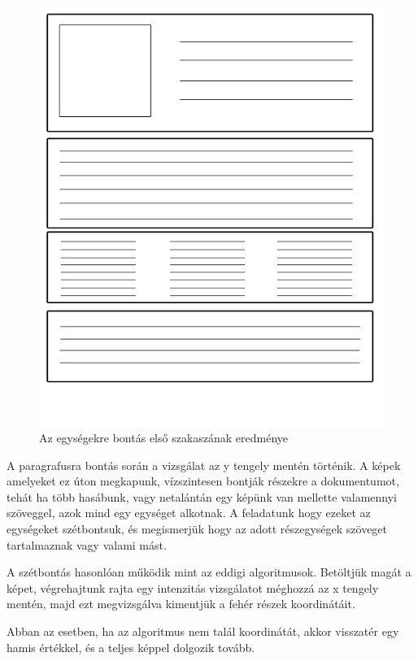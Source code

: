 \begin{figure}[H]
\centering
\includegraphics[scale=1]{images/page2.png}
\caption{Az egységekre bontás első szakaszának eredménye}
\label{fig:page 2}
\end{figure}

A paragrafusra bontás során a vizsgálat az y tengely mentén történik. A képek amelyeket ez úton megkapunk, vízszintesen bontják részekre a dokumentumot, tehát ha több hasábunk, vagy netalántán egy képünk van mellette valamennyi szöveggel, azok mind egy egységet alkotnak. A feladatunk hogy ezeket az egységeket szétbontsuk, és megismerjük hogy az adott részegységek szöveget tartalmaznak vagy valami mást.

A szétbontás hasonlóan működik mint az eddigi algoritmusok. Betöltjük magát a képet, végrehajtunk rajta egy intenzitás vizsgálatot méghozzá az x tengely mentén, majd ezt megvizsgálva kimentjük a fehér részek koordinátáit.

Abban az esetben, ha az algoritmus nem talál koordinátát, akkor visszatér egy hamis értékkel, és a teljes képpel dolgozik tovább.

